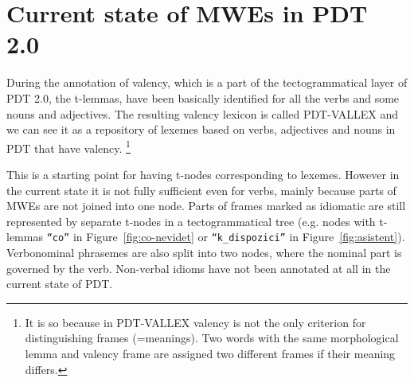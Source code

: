 

\section{Current state of MWEs in PDT 2.0}
\label{sec:pdt}
%

During the annotation of valency, which is a part of the tectogrammatical layer of PDT 2.0, the t-lemmas, have been basically identified for all the verbs and some nouns and adjectives.
The resulting valency lexicon is called PDT-VALLEX \cite{hajic:2003} and we can see it as a repository of lexemes based on verbs, adjectives and nouns in PDT that have valency.
%
\footnote{It is so because in PDT-VALLEX valency is not the only criterion for distinguishing frames (=meanings). Two words with the same morphological lemma and valency frame are assigned two different frames if their meaning differs.} 

This is a starting point for having t-nodes corresponding to lexemes. However in the current state it is not fully sufficient even for verbs, mainly because parts of MWEs are not joined into one node. Parts of frames marked as idiomatic are still represented by separate t-nodes in a tectogrammatical tree (e.g. nodes with t-lemmas {\tt“co”} in Figure~\ref{fig:co-nevidet} or {\tt“k\_dispozici”} in Figure~\ref{fig:asistent}). Verbonominal phrasemes are also split into two nodes, where the nominal part is governed by the verb. Non-verbal idioms have not been annotated at all in the current state of PDT. 


